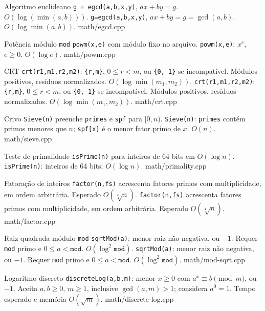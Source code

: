 \templateentry
{Algoritmo euclideano}
{\texttt{g = egcd(a,b,x,y)}, $ax + by = g$. $O(\log(\min(a,b)))$.}
{\texttt{g=egcd(a,b,x,y)}, $ax+by=g=\gcd(a,b)$. $O(\log\min(a,b))$.}
{math/egcd.cpp}

\ifextended

\templateentry
{Potência módulo \texttt{mod}}
{\texttt{powm(x,e)} com módulo fixo no arquivo.}
{\texttt{powm(x,e)}: $x^e$, $e\ge0$. $O(\log e)$.}
{math/powm.cpp}

\fi

\templateentry
{CRT}
{\texttt{crt(r1,m1,r2,m2)}: \texttt{\{r,m\}}, $0\le r<m$, ou \texttt{\{0,-1\}} se incompatível. Módulos positivos, resíduos normalizados. $O(\log\min(m_1,m_2))$.}
{\texttt{crt(r1,m1,r2,m2)}: \texttt{\{r,m\}}, $0\le r<m$, ou \texttt{\{0,-1\}} se incompatível. Módulos positivos, resíduos normalizados. $O(\log\min(m_1,m_2))$.}
{math/crt.cpp}

\ifextended

\templateentry
{Crivo}
{\texttt{Sieve(n)} preenche \texttt{primes} e \texttt{spf} para $[0,n)$.}
{\texttt{Sieve(n)}: \texttt{primes} contém primos menores que $n$; \texttt{spf[x]} é o menor fator primo de $x$. $O(n)$.}
{math/sieve.cpp}

\fi

\templateentry
{Teste de primalidade}
{\texttt{isPrime(n)} para inteiros de 64 bits em $O(\log n)$.}
{\texttt{isPrime(n)}: inteiros de 64 bits; $O(\log n)$.}
{math/primality.cpp}

\templateentry
{Fatoração de inteiros}
{\texttt{factor(n,fs)} acrescenta fatores primos com multiplicidade, em ordem arbitrária. Esperado $O(\sqrt[4]{n})$.}
{\texttt{factor(n,fs)} acrescenta fatores primos com multiplicidade, em ordem arbitrária. Esperado $O(\sqrt[4]{n})$.}
{math/factor.cpp}

\templateentry
{Raiz quadrada módulo \texttt{mod}}
{\texttt{sqrtMod(a)}: menor raiz não negativa, ou $-1$. Requer \texttt{mod} primo e $0\le a<\mathtt{mod}$. $O(\log^2 \mathtt{mod})$.}
{\texttt{sqrtMod(a)}: menor raiz não negativa, ou $-1$. Requer \texttt{mod} primo e $0\le a<\mathtt{mod}$. $O(\log^2 \mathtt{mod})$.}
{math/mod-sqrt.cpp}

\ifextended

\templateentry
{Logaritmo discreto}
{}
{\texttt{discreteLog(a,b,m)}: menor $x\ge0$ com $a^x\equiv b\pmod m$, ou $-1$. Aceita $a,b\ge0$, $m\ge1$, inclusive $\gcd(a,m)>1$; considera $a^0=1$. Tempo esperado e memória $O(\sqrt m)$.}
{math/discrete-log.cpp}

\fi

